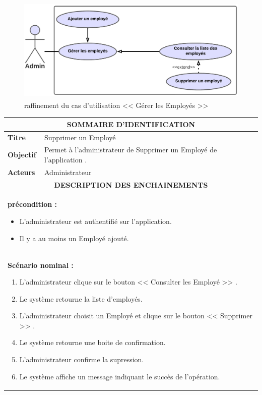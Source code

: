 \documentclass[12pt]{report}
\begin{document}
\begin{figure}[H]
  \centering
  \includegraphics[width=15cm,height=5cm]{gereremp}
  \caption{raffinement du cas d'utilisation << Gérer les Employés >> }
  \label{fig:votre-label}
\end{figure}
\begin{table}[H]
\centering
\def\arraystretch{1.5}
\begin{tabular}{|p{2.5cm}|p{14.5cm}|}
   \hline
   \multicolumn{2}{|c|}{
   \textbf{SOMMAIRE D'IDENTIFICATION}
   } \\
   \hline
    \textbf{Titre} &  Supprimer un Employé  \\
   \hline
    \textbf{Objectif}  &  Permet à l'administrateur de Supprimer un Employé de l'application .  \\
   \hline
    \textbf{Acteurs}  &  Administrateur \\
   \hline
   \multicolumn{2}{|c|}{ \textbf{DESCRIPTION DES ENCHAINEMENTS} } \\
   \hline
   \multicolumn{2}{|p{17cm}|}{\textbf{ précondition : }
   \begin{itemize}[label={$\bullet$}]
      \item L'administrateur est authentifié sur l'application. 
      \item   Il y a au moins un Employé ajouté. 
   \end{itemize}} \\
   \hline
   \multicolumn{2}{|p{17cm}|}{\textbf{ Scénario nominal : }
   \begin{enumerate}
      \item  L'administrateur clique sur le bouton << Consulter les Employé >> .
      \item  Le système retourne la liste d'employés.
      \item  L'administrateur choisit un Employé et clique sur le bouton << Supprimer >> .
      \item  Le système retourne une boite de confirmation.
      \item  L'administrateur confirme la supression.
      \item  Le système affiche un message indiquant le succès de l'opération.
      

\end{enumerate}}
\end{tabular}
\end{table}
\end{document}
